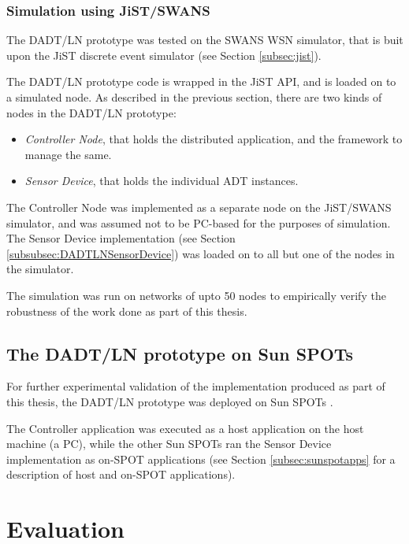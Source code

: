 \subsubsection{Simulation using JiST/SWANS}

The DADT/LN prototype was tested on the SWANS WSN simulator, that is buit upon
the JiST discrete event simulator (see Section \ref{subsec:jist}). 

The DADT/LN prototype code is wrapped in the JiST API, and is loaded on to a
simulated node. As described in the previous section, there are two kinds of
nodes in the DADT/LN prototype:

\begin{itemize}
  \item \emph{Controller Node}, that holds the distributed application, and the
  framework to manage the same.
  \item \emph{Sensor Device}, that holds the individual ADT instances. 
\end{itemize}

The Controller Node was implemented as a separate node on the JiST/SWANS
simulator, and was assumed not to be PC-based for the purposes of simulation.
The Sensor Device implementation (see Section
\ref{subsubsec:DADTLNSensorDevice}) was loaded on to all but one of the nodes in
the simulator.

The simulation was run on networks of upto 50 nodes to empirically verify the
robustness of the work done as part of this thesis.

\subsection{The DADT/LN prototype on Sun SPOTs}

For further experimental validation of the implementation produced as part of 
this thesis,
the DADT/LN prototype was deployed on Sun SPOTs \cite{simon_squawk:2006}. 

The
Controller application was executed as a host application on the host machine (a
PC), while the other Sun SPOTs ran the Sensor Device implementation as on-SPOT
applications (see Section \ref{subsec:sunspotapps} for a description of host and on-SPOT
applications).



\section{Evaluation}

